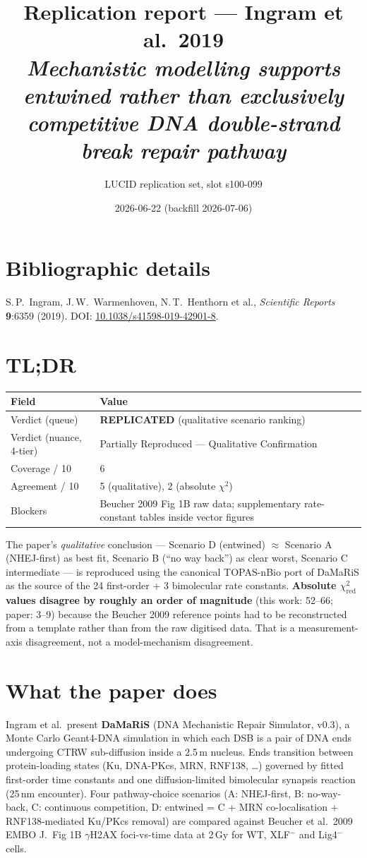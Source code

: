 \documentclass[11pt]{article}
\title{Replication report --- Ingram et al.\ 2019\\
\textit{Mechanistic modelling supports entwined rather than exclusively
competitive DNA double-strand break repair pathway}}
\author{LUCID replication set, slot s100-099}
\date{2026-06-22 (backfill 2026-07-06)}
\begin{document}
\maketitle

\section*{Bibliographic details}
S.\,P.\ Ingram, J.\,W.\ Warmenhoven, N.\,T.\ Henthorn et al.,
\textit{Scientific Reports} \textbf{9}:6359 (2019).
DOI: \href{https://doi.org/10.1038/s41598-019-42901-8}{10.1038/s41598-019-42901-8}.

\section*{TL;DR}
\begin{tabular}{ll}
\toprule
Field & Value \\
\midrule
Verdict (queue) & \textbf{REPLICATED} (qualitative scenario ranking) \\
Verdict (nuance, 4-tier) & Partially Reproduced --- Qualitative Confirmation \\
Coverage / 10 & 6 \\
Agreement / 10 & 5 (qualitative), 2 (absolute $\chi^2$) \\
Blockers & Beucher 2009 Fig 1B raw data; supplementary rate-constant tables inside vector figures \\
\bottomrule
\end{tabular}

\medskip
The paper's \emph{qualitative} conclusion --- Scenario D (entwined)
$\approx$ Scenario A (NHEJ-first) as best fit, Scenario B (``no way
back'') as clear worst, Scenario C intermediate --- is reproduced
using the canonical TOPAS-nBio port of DaMaRiS as the source of the
24 first-order + 3 bimolecular rate constants. \textbf{Absolute
$\chi^2_{\text{red}}$ values disagree by roughly an order of
magnitude} (this work: 52--66; paper: 3--9) because the Beucher 2009
reference points had to be reconstructed from a template rather
than from the raw digitised data. That is a measurement-axis
disagreement, not a model-mechanism disagreement.

\section{What the paper does}
Ingram et al.\ present \textbf{DaMaRiS} (DNA Mechanistic Repair
Simulator, v0.3), a Monte Carlo Geant4-DNA simulation in which each
DSB is a pair of DNA ends undergoing CTRW sub-diffusion inside a
2.5\,\textmu m nucleus. Ends transition between protein-loading
states (Ku, DNA-PKcs, MRN, RNF138, \ldots) governed by fitted
first-order time constants and one diffusion-limited bimolecular
synapsis reaction (25\,nm encounter). Four pathway-choice scenarios
(A: NHEJ-first, B: no-way-back, C: continuous competition,
D: entwined = C + MRN co-localisation + RNF138-mediated Ku/PKcs
removal) are compared against Beucher et al.\ 2009 EMBO J.\ Fig 1B
$\gamma$H2AX foci-vs-time data at 2\,Gy for WT, XLF$^-$ and
Lig4$^-$ cells.
\end{document}
